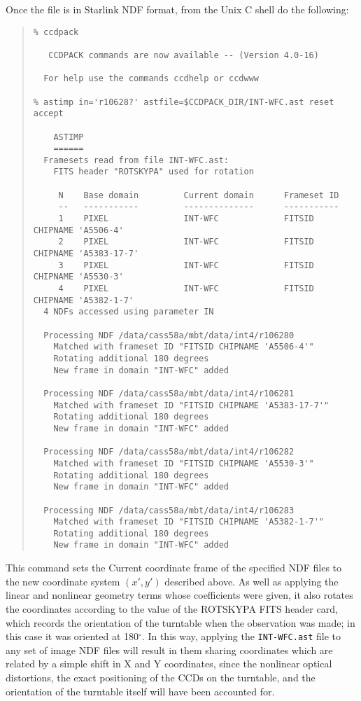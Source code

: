 \documentclass[twoside,11pt]{article}
\newcommand{\latexhtml}[2]{#1}
\renewcommand{\_}{\texttt{\symbol{95}}}
\newcommand{\ttsize}{\latexhtml{\small}{}}
\newenvironment{myquote}{\begin{quote}\ttsize}{\end{quote}}
\begin{document}
Once the file is in Starlink NDF format,
from the Unix C shell do the following:
\begin{myquote}
\begin{verbatim}
% ccdpack

   CCDPACK commands are now available -- (Version 4.0-16)

  For help use the commands ccdhelp or ccdwww

% astimp in='r10628?' astfile=$CCDPACK_DIR/INT-WFC.ast reset accept

    ASTIMP
    ======
  Framesets read from file INT-WFC.ast:
    FITS header "ROTSKYPA" used for rotation

     N    Base domain         Current domain      Frameset ID
     --   -----------         --------------      -----------
     1    PIXEL               INT-WFC             FITSID CHIPNAME 'A5506-4'
     2    PIXEL               INT-WFC             FITSID CHIPNAME 'A5383-17-7'
     3    PIXEL               INT-WFC             FITSID CHIPNAME 'A5530-3'
     4    PIXEL               INT-WFC             FITSID CHIPNAME 'A5382-1-7'
  4 NDFs accessed using parameter IN

  Processing NDF /data/cass58a/mbt/data/int4/r106280
    Matched with frameset ID "FITSID CHIPNAME 'A5506-4'"
    Rotating additional 180 degrees
    New frame in domain "INT-WFC" added

  Processing NDF /data/cass58a/mbt/data/int4/r106281
    Matched with frameset ID "FITSID CHIPNAME 'A5383-17-7'"
    Rotating additional 180 degrees
    New frame in domain "INT-WFC" added

  Processing NDF /data/cass58a/mbt/data/int4/r106282
    Matched with frameset ID "FITSID CHIPNAME 'A5530-3'"
    Rotating additional 180 degrees
    New frame in domain "INT-WFC" added

  Processing NDF /data/cass58a/mbt/data/int4/r106283
    Matched with frameset ID "FITSID CHIPNAME 'A5382-1-7'"
    Rotating additional 180 degrees
    New frame in domain "INT-WFC" added
\end{verbatim}
\end{myquote}
This command sets the Current coordinate frame of the specified
NDF files to the new coordinate system $(x',y')$ described above.
As well as applying the linear and nonlinear geometry terms whose
coefficients were given,
it also rotates the coordinates according to the value of the
ROTSKYPA FITS header card, which records the orientation of the
turntable when the observation was made;
in this case it was oriented at 180$^\circ$.
In this way, applying the {\tt INT-WFC.ast} file to any set of
image NDF files will result in them sharing coordinates which
are related by a simple shift in X and Y coordinates,
since the nonlinear optical distortions,
the exact positioning of the CCDs on the turntable,
and the orientation of the turntable itself will have been
accounted for.
\end{document}
